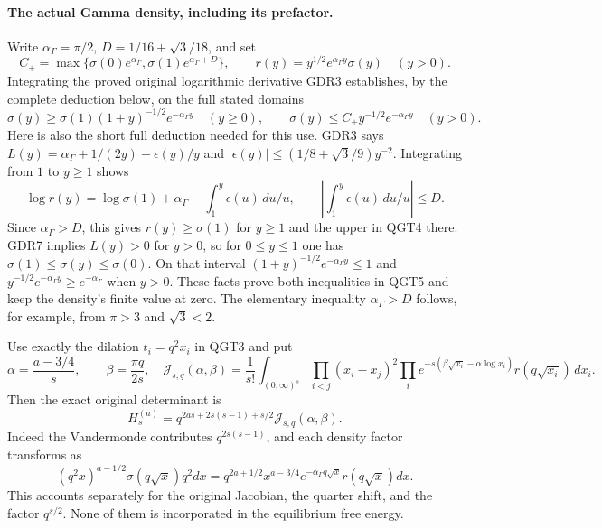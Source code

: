 \documentclass[11pt,a4paper]{article}
\begin{document}
\paragraph{The actual Gamma density, including its prefactor.}
Write $\alpha_\Gamma=\pi/2$, $D=1/16+\sqrt3/18$, and set
\[
 C_+=\max\{\sigma(0)e^{\alpha_\Gamma},\sigma(1)e^{\alpha_\Gamma+D}\},
 \qquad r(y)=y^{1/2}e^{\alpha_\Gamma y}\sigma(y)\quad(y>0).
 \tag{QGT4}
\]
Integrating the proved original logarithmic derivative GDR3 establishes,
by the complete deduction below, on the full stated domains
\[
 \sigma(y)\ge\sigma(1)(1+y)^{-1/2}e^{-\alpha_\Gamma y}\quad(y\ge0),
 \qquad \sigma(y)\le C_+y^{-1/2}e^{-\alpha_\Gamma y}\quad(y>0).
 \tag{QGT5}
\]
Here is also the short full deduction needed for this use. GDR3 says
$L(y)=\alpha_\Gamma+1/(2y)+\epsilon(y)/y$ and
$|\epsilon(y)|\le(1/8+\sqrt3/9)y^{-2}$. Integrating from $1$ to
$y\ge1$ shows
\[
 \log r(y)=\log\sigma(1)+\alpha_\Gamma-\int_1^y\epsilon(u)\,du/u,
 \qquad \left|\int_1^y\epsilon(u)\,du/u\right|\le D.
\]
Since $\alpha_\Gamma>D$, this gives $r(y)\ge\sigma(1)$ for $y\ge1$ and the
upper in QGT4 there. GDR7 implies $L(y)>0$ for $y>0$, so for
$0\le y\le1$ one has $\sigma(1)\le\sigma(y)\le\sigma(0)$.
On that interval $(1+y)^{-1/2}e^{-\alpha_\Gamma y}\le1$ and
$y^{-1/2}e^{-\alpha_\Gamma y}\ge e^{-\alpha_\Gamma}$ when $y>0$. These facts prove both
inequalities in QGT5 and keep the density's finite value at zero.
The elementary inequality $\alpha_\Gamma>D$ follows, for example, from
$\pi>3$ and $\sqrt3<2$.

Use exactly the dilation $t_i=q^2x_i$ in QGT3 and put
\[
 \alpha=\frac{a-3/4}{s},\qquad \beta=\frac{\pi q}{2s},
 \quad
 \mathcal J_{s,q}(\alpha,\beta)=\frac1{s!}
 \int_{(0,\infty)^s}\prod_{i<j}(x_i-x_j)^2
 \prod_i e^{-s(\beta\sqrt{x_i}-\alpha\log x_i)}
                     r(q\sqrt{x_i})\,dx_i.
 \tag{QGT6}
\]
Then the exact original determinant is
\[
 \boxed{H_s^{(a)}
   =q^{2as+2s(s-1)+s/2}\mathcal J_{s,q}(\alpha,\beta).}
 \tag{QGT7}
\]
Indeed the Vandermonde contributes $q^{2s(s-1)}$, and each density
factor transforms as
\[
 (q^2x)^{a-1/2}\sigma(q\sqrt x)q^2dx
 =q^{2a+1/2}x^{a-3/4}e^{-\alpha_\Gamma q\sqrt x}r(q\sqrt x)dx.
\]
This accounts separately for the original Jacobian, the quarter shift,
and the factor $q^{s/2}$. None of them is incorporated in the
equilibrium free energy.
\end{document}
